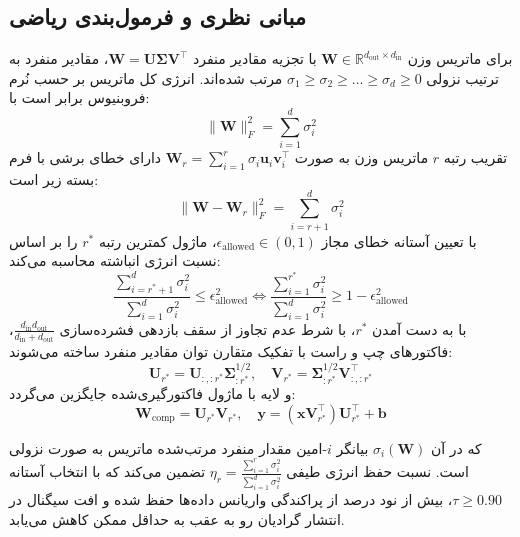 \subsection{مبانی نظری و فرمول‌بندی ریاضی}
برای ماتریس وزن $\mathbf{W} \in \mathbb{R}^{d_{\text{out}} \times d_{\text{in}}}$ با تجزیه مقادیر منفرد $\mathbf{W} = \mathbf{U} \mathbf{\Sigma} \mathbf{V}^\top$، مقادیر منفرد به ترتیب نزولی $\sigma_1 \ge \sigma_2 \ge \dots \ge \sigma_d \ge 0$ مرتب شده‌اند. انرژی کل ماتریس بر حسب نُرم فروبنیوس برابر است با:
\begin{equation}
\|\mathbf{W}\|_F^2 = \sum_{i=1}^d \sigma_i^2
\end{equation}
تقریب رتبه $r$ ماتریس وزن به صورت $\mathbf{W}_r = \sum_{i=1}^r \sigma_i \mathbf{u}_i \mathbf{v}_i^\top$ دارای خطای برشی با فرم بسته زیر است:
\begin{equation}
\|\mathbf{W} - \mathbf{W}_r\|_F^2 = \sum_{i=r+1}^d \sigma_i^2
\end{equation}
با تعیین آستانه خطای مجاز $\epsilon_{\text{allowed}} \in (0, 1)$، ماژول کمترین رتبه $r^*$ را بر اساس نسبت انرژی انباشته محاسبه می‌کند:
\begin{equation}
\frac{\sum_{i=r^*+1}^d \sigma_i^2}{\sum_{i=1}^d \sigma_i^2} \le \epsilon_{\text{allowed}}^2 \iff \frac{\sum_{i=1}^{r^*} \sigma_i^2}{\sum_{i=1}^d \sigma_i^2} \ge 1 - \epsilon_{\text{allowed}}^2
\end{equation}
با به دست آمدن $r^*$، با شرط عدم تجاوز از سقف بازدهی فشرده‌سازی $\frac{d_{\text{in}} d_{\text{out}}}{d_{\text{in}} + d_{\text{out}}}$، فاکتورهای چپ و راست با تفکیک متقارن توان مقادیر منفرد ساخته می‌شوند:
\begin{equation}
\mathbf{U}_{r^*} = \mathbf{U}_{:, :r^*} \mathbf{\Sigma}_{:r^*}^{1/2}, \quad \mathbf{V}_{r^*} = \mathbf{\Sigma}_{:r^*}^{1/2} \mathbf{V}_{:, :r^*}^\top
\end{equation}
و لایه با ماژول فاکتورگیری‌شده جایگزین می‌گردد:
\begin{equation}
\mathbf{W}_{\text{comp}} = \mathbf{U}_{r^*} \mathbf{V}_{r^*}, \quad \mathbf{y} = (\mathbf{x} \mathbf{V}_{r^*}^\top) \mathbf{U}_{r^*}^\top + \mathbf{b}
\end{equation}

که در آن $\sigma_i(\mathbf{W})$ بیانگر $i$-امین مقدار منفرد مرتب‌شده ماتریس به صورت نزولی است. نسبت حفظ انرژی طیفی $\eta_r = \frac{\sum_{i=1}^r \sigma_i^2}{\sum_{i=1}^{d} \sigma_i^2}$ تضمین می‌کند که با انتخاب آستانه $\tau \ge 0.90$، بیش از نود درصد از پراکندگی واریانس داده‌ها حفظ شده و افت سیگنال در انتشار گرادیان رو به عقب به حداقل ممکن کاهش می‌یابد.

